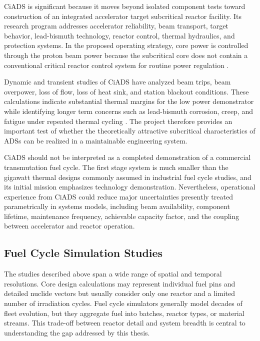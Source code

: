 CiADS is significant because it moves beyond isolated component tests toward
construction of an integrated accelerator target subcritical reactor
facility. Its research program addresses accelerator reliability, beam
transport, target behavior, lead-bismuth technology, reactor control,
thermal hydraulics, and protection systems. In the proposed operating
strategy, core power is controlled through the proton beam power because the
subcritical core does not contain a conventional critical reactor control
system for routine power regulation
\cite{yin_power_2022,li_control_2025}.

Dynamic and transient studies of CiADS have analyzed beam trips, beam
overpower, loss of flow, loss of heat sink, and station blackout conditions.
These calculations indicate substantial thermal margins for the low power
demonstrator while identifying longer term concerns such as lead-bismuth
corrosion, creep, and fatigue under repeated thermal cycling
\cite{wang_transient_2023}. The project therefore
provides an important test of whether the theoretically attractive
subcritical characteristics of \glspl{ADS} can be realized in a maintainable
engineering system.

CiADS should not be interpreted as a completed demonstration of a commercial
transmutation fuel cycle. The first stage system is much smaller than the
gigawatt thermal designs commonly assumed in industrial fuel cycle studies,
and its initial mission emphasizes technology demonstration. Nevertheless,
operational experience from CiADS could reduce major uncertainties presently
treated parametrically in systems models, including beam availability,
component lifetime, maintenance frequency, achievable capacity factor, and
the coupling between accelerator and reactor operation.

\subsection{Fuel Cycle Simulation Studies}
\label{subsec:ads-fuel-cycle-simulations}

The studies described above span a wide range of spatial and temporal
resolutions. Core design calculations may represent individual fuel pins and
detailed nuclide vectors but usually consider only one reactor and a limited
number of irradiation cycles. Fuel cycle simulators generally model decades
of fleet evolution, but they aggregate fuel into batches, reactor types, or
material streams. This trade-off between reactor detail and system breadth is
central to understanding the gap addressed by this thesis.

